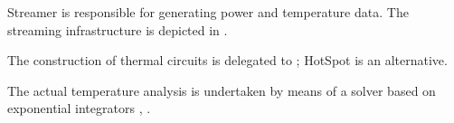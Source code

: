 
Streamer is responsible for generating power and temperature data. The streaming
infrastructure is depicted in .

The construction of thermal circuits is delegated to 
\cite{sridhar2010}; HotSpot \cite{skadron2004} is an alternative.

The actual temperature analysis is undertaken by means of a solver based on
exponential integrators \cite{hochbruck2010}, \cite{ukhov2012}.
